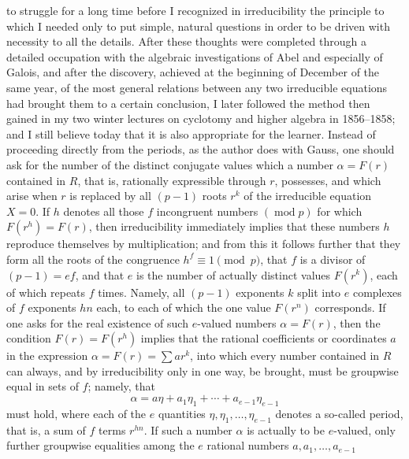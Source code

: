 \documentclass[11pt]{article}
\newcommand{\origpage}[1]{\par\vspace{0.25em}\noindent{\footnotesize\itshape [Printed page #1]}\par\vspace{0.25em}}
\begin{document}
\origpage{415}
to struggle for a long time before I recognized in irreducibility the principle to which I needed only to put simple, natural questions in order to be driven with necessity to all the details. After these thoughts were completed through a detailed occupation with the algebraic investigations of Abel and especially of Galois, and after the discovery, achieved at the beginning of December of the same year, of the most general relations between any two irreducible equations had brought them to a certain conclusion, I later followed the method then gained in my two winter lectures on cyclotomy and higher algebra in 1856--1858; and I still believe today that it is also appropriate for the learner. Instead of proceeding directly from the periods, as the author does with Gauss, one should ask for the number of the distinct conjugate values which a number $\alpha=F(r)$ contained in $R$, that is, rationally expressible through $r$, possesses, and which arise when $r$ is replaced by all $(p-1)$ roots $r^k$ of the irreducible equation $X=0$. If $h$ denotes all those $f$ incongruent numbers $(\operatorname{mod} p)$ for which $F(r^h)=F(r)$, then irreducibility immediately implies that these numbers $h$ reproduce themselves by multiplication; and from this it follows further that they form all the roots of the congruence $h^f\equiv1\pmod p$, that $f$ is a divisor of $(p-1)=ef$, and that $e$ is the number of actually distinct values $F(r^k)$, each of which repeats $f$ times. Namely, all $(p-1)$ exponents $k$ split into $e$ complexes of $f$ exponents $hn$ each, to each of which the one value $F(r^n)$ corresponds. If one asks for the real existence of such $e$-valued numbers $\alpha=F(r)$, then the condition $F(r)=F(r^h)$ implies that the rational coefficients or coordinates $a$ in the expression $\alpha=F(r)=\sum ar^k$, into which every number contained in $R$ can always, and by irreducibility only in one way, be brought, must be groupwise equal in sets of $f$; namely, that
\[
 \alpha=a\eta+a_1\eta_1+\cdots+a_{e-1}\eta_{e-1}
\]
must hold, where each of the $e$ quantities $\eta,\eta_1,\ldots,\eta_{e-1}$ denotes a so-called period, that is, a sum of $f$ terms $r^{hn}$. If such a number $\alpha$ is actually to be $e$-valued, only further groupwise equalities among the $e$ rational numbers $a,a_1,\ldots,a_{e-1}$
\end{document}
